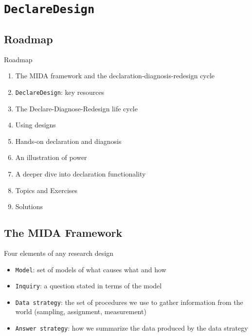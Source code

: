 \documentclass[
  11pt,
  ignorenonframetext,
]{beamer}
\providecommand{\tightlist}{%
  \setlength{\itemsep}{0pt}\setlength{\parskip}{0pt}}\usepackage{longtable,booktabs,array}
\begin{document}
\hypertarget{declaredesign}{%
\section{\texorpdfstring{\texttt{DeclareDesign}}{DeclareDesign}}\label{declaredesign}}

\hypertarget{roadmap-1}{%
\subsection{Roadmap}\label{roadmap-1}}

\begin{frame}[fragile]{Roadmap}
\begin{enumerate}
\tightlist
\item
  The MIDA framework and the declaration-diagnosis-redesign cycle
\item
  \texttt{DeclareDesign}: key resources
\item
  The Declare-Diagnose-Redesign life cycle
\item
  Using designs
\item
  Hands-on declaration and diagnosis
\item
  An illustration of power
\item
  A deeper dive into declaration functionality
\item
  Topics and Exercises
\item
  Solutions
\end{enumerate}
\end{frame}

\hypertarget{the-mida-framework}{%
\subsection{The MIDA Framework}\label{the-mida-framework}}

\begin{frame}[fragile]{Four elements of any research design}
\protect\hypertarget{four-elements-of-any-research-design}{}
\begin{itemize}
\tightlist
\item
  \texttt{Model}: set of models of what causes what and how
\item
  \texttt{Inquiry}: a question stated in terms of the model
\item
  \texttt{Data\ strategy}: the set of procedures we use to gather
  information from the world (sampling, assignment, measurement)
\item
  \texttt{Answer\ strategy}: how we summarize the data produced by the
  data strategy
\end{itemize}
\end{frame}
\end{document}
